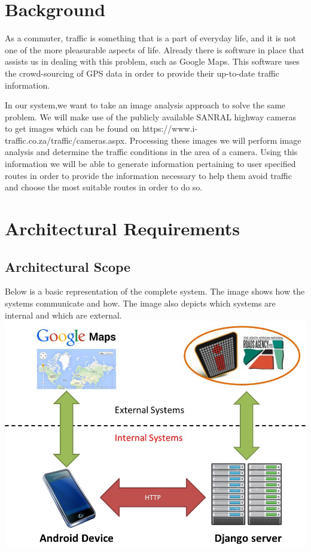 \documentclass[a4paper,12pt]{article}
\begin{document}
\section{Background}
As a commuter, traffic is something that is a part of everyday life, and it is not one of the more pleasurable aspects of life. Already there is software in place that assists us in dealing with this problem, such as Google Maps. This software uses the crowd-sourcing of GPS data in order to provide their up-to-date traffic information.

In our system,we want to take an image analysis approach to solve the same problem. We will make use of the publicly available SANRAL highway cameras to get images which can be found on https://www.i-traffic.co.za/traffic/cameras.aspx. Processing these images we will perform image analysis and determine the traffic conditions in the area of a camera. Using this information we will be able to generate information pertaining to user specified routes in order to provide the information necessary to help them avoid traffic and choose the most suitable routes in order to do so.

\section{Architectural Requirements}
\subsection{Architectural Scope}
Below is a basic representation of the complete system. The image shows how the systems communicate and how. The image also depicts which systems are internal and which are external.\\ 
\includegraphics[width=\linewidth]{diagram.jpg}
\end{document}
